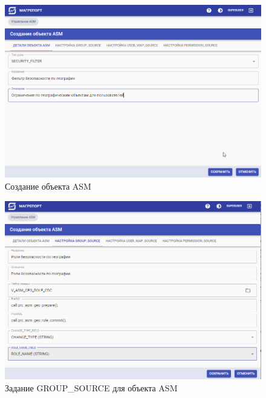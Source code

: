 \documentclass[../user-manual.tex]{subfiles}
\begin{document}
	\begin{figure}[h]
		\centering
		\includegraphics[width=\graphicswidth]{img/18-asm-details.png}
		\caption{Создание объекта ASM}
		\label{fig:asm-details}
	\end{figure}	
	
	\begin{figure}[h]
		\centering
		\includegraphics[width=\graphicswidth]{img/19-asm-group-source.png}
		\caption{Задание GROUP\_SOURCE для объекта ASM}
		\label{fig:asm-group-source}
	\end{figure}
\end{document}
